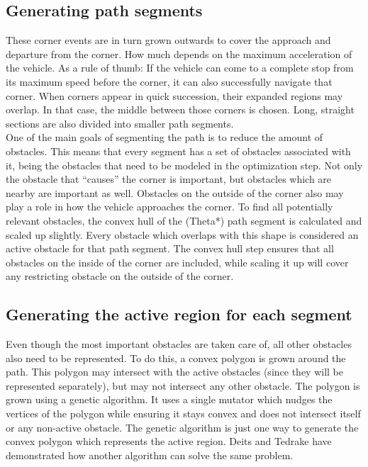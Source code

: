 \subsection{Generating path segments}
These corner events are in turn grown outwards to cover the approach and departure from the corner. How much depends on the maximum acceleration of the vehicle. As a rule of thumb: If the vehicle can come to a complete stop from its maximum speed before the corner, it can also successfully navigate that corner. When corners appear in quick succession, their expanded regions may overlap. In that case, the middle between those corners is chosen. Long, straight sections are also divided into smaller path segments.\\
One of the main goals of segmenting the path is to reduce the amount of obstacles. This means that every segment has a set of obstacles associated with it, being the obstacles that need to be modeled in the optimization step. Not only the obstacle that ``causes'' the corner is important, but obstacles which are nearby are important as well. Obstacles on the outside of the corner also may play a role in how the vehicle approaches the corner. To find all potentially relevant obstacles, the convex hull of the (Theta*) path segment is calculated and scaled up slightly. Every obstacle which overlaps with this shape is considered an active obstacle for that path segment. The convex hull step ensures that all obstacles on the inside of the corner are included, while scaling it up will cover any restricting obstacle on the outside of the corner.
\subsection{Generating the active region for each segment}
Even though the most important obstacles are taken care of, all other obstacles also need to be represented. To do this, a convex polygon is grown around the path. This polygon may intersect with the active obstacles (since they will be represented separately), but may not intersect any other obstacle. The polygon is grown using a genetic algorithm. It uses a single mutator which nudges the vertices of the polygon while ensuring it stays convex and does not intersect itself or any non-active obstacle. The genetic algorithm is just one way to generate the convex polygon which represents the active region. Deits and Tedrake\cite{Deits2015} have demonstrated how another algorithm can solve the same problem.